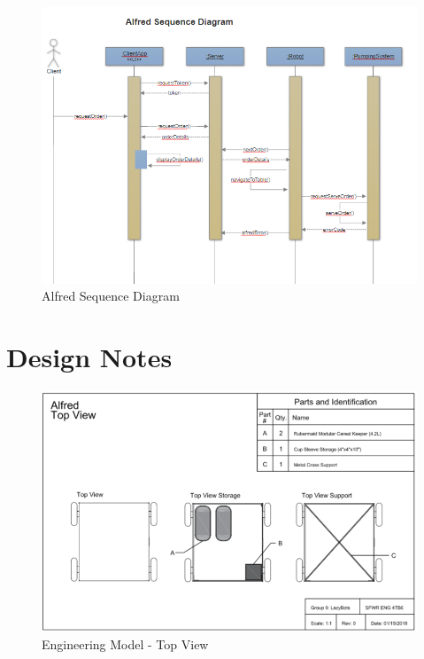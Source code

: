 \documentclass [10pt]{article}
\begin{document}
\begin{figure}
	\centering
	\includegraphics [scale = 0.6] {figures/Alfred_SequenceDiagram.png}
	\caption{Alfred Sequence Diagram}
\end{figure}

\newpage
\section {Design Notes}

\begin{figure}[h!]
	\centering
	\includegraphics [scale = 0.55] {figures/CAD_Top_View.png}
	\caption{Engineering Model - Top View}
\end{figure}
	
\end{document}
